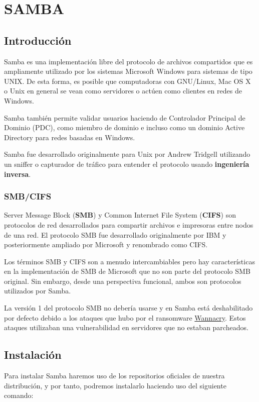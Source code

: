 \chapter{SAMBA}
\section{Introducción}
Samba es una implementación libre del protocolo de archivos compartidos que es ampliamente utilizado por los sistemas Microsoft Windows para sistemas de tipo UNIX. De esta forma, es posible que computadoras con GNU/Linux, Mac OS X o Unix en general se vean como servidores o actúen como clientes en redes de Windows.

Samba también permite validar usuarios haciendo de Controlador Principal de Dominio (PDC), como miembro de dominio e incluso como un dominio Active Directory para redes basadas en Windows.

Samba fue desarrollado originalmente para Unix por Andrew Tridgell utilizando un sniffer o capturador de tráfico para entender el protocolo usando \textbf{ingeniería inversa}.

\subsection{SMB/CIFS}
Server Message Block (\textbf{SMB}) y Common Internet File System (\textbf{CIFS}) son protocolos de red desarrollados para compartir archivos e impresoras entre nodos de una red. El protocolo SMB fue desarrollado originalmente por IBM y posteriormente ampliado por Microsoft y renombrado como CIFS.

Los términos SMB y CIFS son a menudo intercambiables pero hay características en la implementación de SMB de Microsoft que no son parte del protocolo SMB original. Sin embargo, desde una perspectiva funcional, ambos son protocolos utilizados por Samba.

La versión 1 del protocolo SMB no debería usarse y en Samba está deshabilitado por defecto debido a los ataques que hubo por el ransomware \href{https://es.wikipedia.org/wiki/Ataques_ransomware_WannaCry}{Wannacry}. Estos ataques utilizaban una vulnerabilidad en servidores que no estaban parcheados.

\section{Instalación}
Para instalar Samba haremos uso de los repositorios oficiales de nuestra distribución, y por tanto, podremos instalarlo haciendo uso del siguiente comando:

